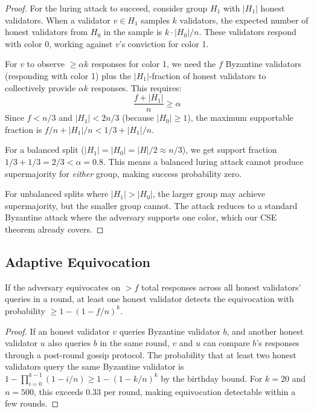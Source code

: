 \begin{proof}
For the luring attack to succeed, consider group $H_1$ with $|H_1|$ honest validators.
When a validator $v \in H_1$ samples $k$ validators, the expected number of honest
validators from $H_0$ in the sample is $k \cdot |H_0|/n$. These validators respond with
color 0, working against $v$'s conviction for color 1.

For $v$ to observe $\geq \alpha k$ responses for color 1, we need the $f$ Byzantine
validators (responding with color 1) plus the $|H_1|$-fraction of honest validators
to collectively provide $\alpha k$ responses. This requires:
\[
\frac{f + |H_1|}{n} \geq \alpha
\]
Since $f < n/3$ and $|H_1| < 2n/3$ (because $|H_0| \geq 1$), the maximum supportable
fraction is $f/n + |H_1|/n < 1/3 + |H_1|/n$.

For a balanced split ($|H_1| = |H_0| = |H|/2 \approx n/3$), we get support fraction
$1/3 + 1/3 = 2/3 < \alpha = 0.8$. This means a balanced luring attack cannot produce
supermajority for \emph{either} group, making success probability zero.

For unbalanced splits where $|H_1| > |H_0|$, the larger group may achieve supermajority,
but the smaller group cannot. The attack reduces to a standard Byzantine attack where
the adversary supports one color, which our CSE theorem already covers.
\end{proof}

\subsection{Adaptive Equivocation}

\begin{lemma}
\label{lem:equivocation}
If the adversary equivocates on $> f$ total responses across all honest validators'
queries in a round, at least one honest validator detects the equivocation with
probability $\geq 1 - (1 - f/n)^k$.
\end{lemma}

\begin{proof}
If an honest validator $v$ queries Byzantine validator $b$, and another honest validator
$u$ also queries $b$ in the same round, $v$ and $u$ can compare $b$'s responses through
a post-round gossip protocol. The probability that at least two honest validators query
the same Byzantine validator is $1 - \prod_{i=0}^{k-1}(1 - i/n) \geq 1 - (1-k/n)^k$
by the birthday bound. For $k = 20$ and $n = 500$, this exceeds 0.33 per round, making
equivocation detectable within a few rounds.
\end{proof}

